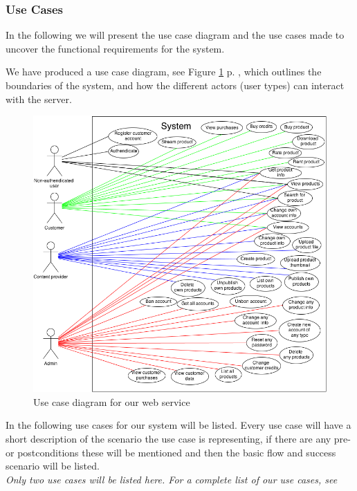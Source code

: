 \subsubsection{Use Cases}
In the following we will present the use case diagram and the use cases made to uncover the functional requirements for the system.

We have produced a use case diagram, see Figure \ref{useCaseImg} p. \pageref{useCaseImg}, which outlines the boundaries of the system, and how the different actors (user types) can interact with the server. 
\begin{figure}[h]
\centering
\includegraphics[scale=0.5]{illustrations/UseCaseDiagram.png}
\caption{Use case diagram for our web service}
\label{useCaseImg}
\end{figure}

In the following use cases for our system will be listed. Every use case will have a short description of the scenario the use case is representing, if there are any pre- or postconditions these will be mentioned and then the basic flow and success scenario will be listed.\\
\textit{Only two use cases will be listed here. For a complete list of our use cases, see}


